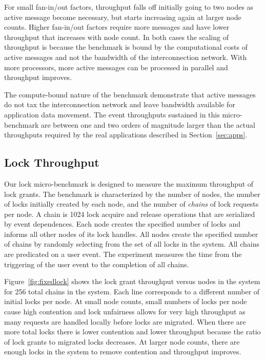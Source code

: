 For small fan-in/out factors, throughput falls off initially going to two nodes as active
message become necessary, but starts increasing again at larger node counts.  Higher
fan-in/out factors require more messages and have lower throughput that increases with
node count.  In both cases the scaling of throughput is because the benchmark is
bound by the computational costs of active messages and not the bandwidth of the
interconnection network.  With more processors, more active messages can be processed
in parallel and throughput improves.  

The compute-bound nature of the benchmark demonstrate that active messages do not tax 
the interconnection network and leave bandwidth available for application data movement.  
The event throughputs sustained in this micro-benchmark are between one and two orders
of magnitude larger than the actual throughputs required by the real applications
described in Section~\ref{sec:apps}.

\subsection{Lock Throughput}
\label{subsec:lockmicro}
Our lock micro-benchmark is designed to measure the maximum throughput of lock
grants.  The benchmark is characterized by the number of nodes, the number
of locks initially created by each node, and the number of {\em chains} of
lock requests per node.  A chain is 1024 lock acquire and release operations that
are serialized by event dependences.  Each node creates the specified number of locks and
informs all other nodes of its lock handles.  All nodes create the specified number
of chains by randomly selecting from the set of all locks in the system.  All chains
are predicated on a user event.  The experiment measures the time from the triggering of
the user event to the completion of all chains.

Figure~\ref{fig:fixedlock} shows the lock grant throughput versus nodes in the system
for 256 total chains in the system.  Each line corresponds
to a different number of initial locks per node.  At small node counts, 
small numbers of locks per node cause high
contention and lock unfairness allows for very high throughput as many requests are
handled locally before locks are migrated.   When there are more total locks there
is lower contention and lower throughput because the ratio of lock grants to migrated
locks decreases.  At larger node counts, there are enough locks
in the system to remove contention and throughput improves.

